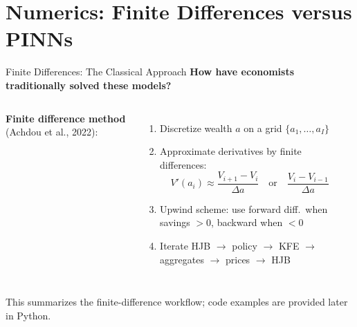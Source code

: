 \documentclass[aspectratio=169,11pt]{beamer}
\newcommand{\emphc}[1]{\textcolor{harvardcrimson}{#1}}
\newcommand{\ud}{\,\mathrm{d}}
\begin{document}
\section{Numerics: Finite Differences versus PINNs}
\begin{frame}{Finite Differences: The Classical Approach}
\small
\textbf{How have economists traditionally solved these models?}

\vspace{0.2em}
\begin{columns}[T]
\textbf{Finite difference method} (Achdou et al., 2022):
\begin{enumerate}\itemsep1pt
    \item Discretize wealth $a$ on a grid $\{a_1, \ldots, a_I\}$
    \item Approximate derivatives by finite differences:
    \[
    V'(a_i) \approx \frac{V_{i+1} - V_i}{\Delta a} \quad \text{or} \quad \frac{V_i - V_{i-1}}{\Delta a}
    \]
    \item \emphc{Upwind scheme}: use forward diff.\ when savings $> 0$, backward when $< 0$
    \item Iterate HJB $\to$ policy $\to$ KFE $\to$ aggregates $\to$ prices $\to$ HJB
\end{enumerate}

\begin{center}
\end{center}
\end{columns}

\vspace{0.1em}
{\footnotesize This summarizes the finite-difference workflow; code examples are provided later in Python.}
\end{frame}
\end{document}
